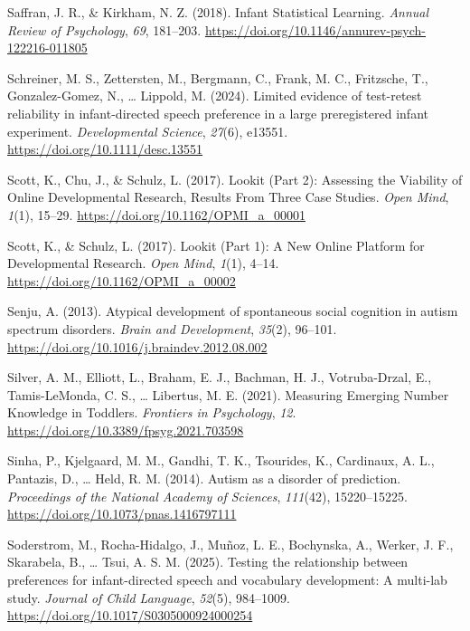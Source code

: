 \documentclass[
  english,
  man,floatsintext]{apa6}
\newlength{\cslhangindent}
\newenvironment{CSLReferences}[2] %
 {\begin{list}{}{%
  \setlength{\itemindent}{0pt}
  \setlength{\leftmargin}{0pt}
  \setlength{\parsep}{0pt}
  \ifodd #1
   \setlength{\leftmargin}{\cslhangindent}
   \setlength{\itemindent}{-1\cslhangindent}
  \fi
  \setlength{\itemsep}{#2\baselineskip}}}
 {\end{list}}
\begin{document}
\begin{CSLReferences}{1}{0}
Saffran, J. R., \& Kirkham, N. Z. (2018). Infant {Statistical Learning}. \emph{Annual Review of Psychology}, \emph{69}, 181--203. \url{https://doi.org/10.1146/annurev-psych-122216-011805}

Schreiner, M. S., Zettersten, M., Bergmann, C., Frank, M. C., Fritzsche, T., Gonzalez-Gomez, N., \ldots{} Lippold, M. (2024). Limited evidence of test-retest reliability in infant-directed speech preference in a large preregistered infant experiment. \emph{Developmental Science}, \emph{27}(6), e13551. \url{https://doi.org/10.1111/desc.13551}

Scott, K., Chu, J., \& Schulz, L. (2017). Lookit ({Part} 2): {Assessing} the {Viability} of {Online Developmental Research}, {Results From Three Case Studies}. \emph{Open Mind}, \emph{1}(1), 15--29. \url{https://doi.org/10.1162/OPMI_a_00001}

Scott, K., \& Schulz, L. (2017). Lookit ({Part} 1): {A New Online Platform} for {Developmental Research}. \emph{Open Mind}, \emph{1}(1), 4--14. \url{https://doi.org/10.1162/OPMI_a_00002}

Senju, A. (2013). Atypical development of spontaneous social cognition in autism spectrum disorders. \emph{Brain and Development}, \emph{35}(2), 96--101. \url{https://doi.org/10.1016/j.braindev.2012.08.002}

Silver, A. M., Elliott, L., Braham, E. J., Bachman, H. J., Votruba-Drzal, E., Tamis-LeMonda, C. S., \ldots{} Libertus, M. E. (2021). Measuring {Emerging Number Knowledge} in {Toddlers}. \emph{Frontiers in Psychology}, \emph{12}. \url{https://doi.org/10.3389/fpsyg.2021.703598}

Sinha, P., Kjelgaard, M. M., Gandhi, T. K., Tsourides, K., Cardinaux, A. L., Pantazis, D., \ldots{} Held, R. M. (2014). Autism as a disorder of prediction. \emph{Proceedings of the National Academy of Sciences}, \emph{111}(42), 15220--15225. \url{https://doi.org/10.1073/pnas.1416797111}

Soderstrom, M., Rocha-Hidalgo, J., Muñoz, L. E., Bochynska, A., Werker, J. F., Skarabela, B., \ldots{} Tsui, A. S. M. (2025). Testing the relationship between preferences for infant-directed speech and vocabulary development: {A} multi-lab study. \emph{Journal of Child Language}, \emph{52}(5), 984--1009. \url{https://doi.org/10.1017/S0305000924000254}


\end{CSLReferences}
\end{document}
